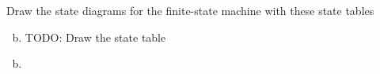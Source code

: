 \documentclass[../main.tex]{subfiles}
\begin{document}
Draw the state diagrams for the finite-state machine with these state tables
\begin{enumerate}[a)]
	\setcounter{enumi}{1}
	\item TODO: Draw the state table
\end{enumerate}

\solution
\begin{enumerate}[a)]
	\setcounter{enumi}{1}
	\item 
\end{enumerate}
\end{document}
